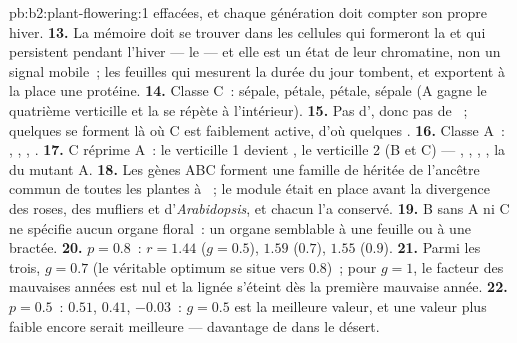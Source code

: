 \begin{solution}{pb:b2:plant-flowering:1}
effacées, et chaque génération doit compter son propre hiver.
\textbf{13.} La mémoire doit se trouver dans les cellules qui formeront
la  et qui persistent pendant l'hiver --- le  --- et elle
est un état de leur chromatine, non un signal mobile~; les feuilles qui
mesurent la durée du jour tombent, et exportent à la place une protéine.
\textbf{14.} Classe C~: sépale, pétale, pétale, sépale (A gagne le quatrième
verticille et la  se répète à l'intérieur).
\textbf{15.} Pas d', donc pas de ~; quelques  se
forment là où C est faiblement active, d'où quelques .
\textbf{16.} Classe A~: , , , .
\textbf{17.} C réprime A~: le verticille 1 devient , le
verticille 2 (B et C)  --- , , , ,
la  du mutant A.
\textbf{18.} Les gènes ABC forment une famille de  héritée de l'ancêtre commun de toutes les plantes à
~; le module était en place avant la divergence des roses, des
mufliers et d'\emph{Arabidopsis}, et chacun l'a conservé.
\textbf{19.} B sans A ni C ne spécifie aucun organe floral~: un organe
semblable à une feuille ou à une bractée.
\textbf{20.} $p = 0.8$~: $r = 1.44$ ($g = 0.5$), $1.59$ ($0.7$), $1.55$
($0.9$).
\textbf{21.} Parmi les trois, $g = 0.7$ (le véritable optimum se situe
vers $0.8$)~; pour $g = 1$, le facteur des mauvaises années est nul et la
lignée s'éteint dès la première mauvaise année.
\textbf{22.} $p = 0.5$~: $0.51$, $0.41$, $-0.03$~: $g = 0.5$ est la
meilleure valeur, et une valeur plus faible encore serait meilleure ---
davantage de  dans le désert.

\end{solution}

